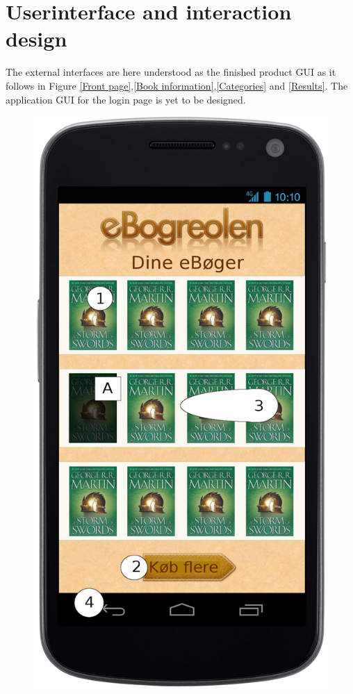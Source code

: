 \documentclass[12pt]{article}
\begin{document}
\section{Userinterface and interaction design}
The external interfaces are here understood as the finished product GUI as it follows in Figure \ref{Front page},\ref{Book information},\ref{Categories} and \ref{Results}. The application GUI for the login page is yet to be designed.
\begin{figure}
\includegraphics[scale=0.7]{gnexforside.png}

\end{figure}
\end{document}
